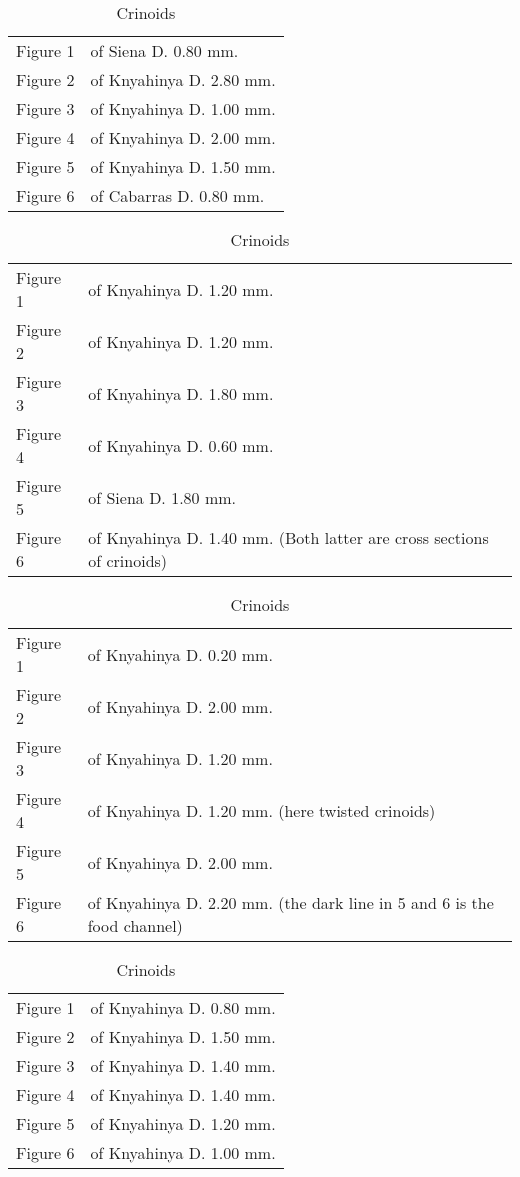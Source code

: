 \documentclass[a4paper, 12pt, oneside]{article}
\begin{document}
\begin{table}[ht!]
\caption{Crinoids}
\centering
\begin{tabular}{ p{2cm} p{10cm} }
\hline
 Figure 1 & of Siena D. 0.80 mm. \\
 Figure 2 & of Knyahinya D. 2.80 mm. \\
 Figure 3 & of Knyahinya D. 1.00 mm. \\
 Figure 4 & of Knyahinya D. 2.00 mm. \\
 Figure 5 & of Knyahinya D. 1.50 mm. \\
 Figure 6 & of Cabarras D. 0.80 mm.
\end{tabular}
\label{table:24}
\end{table}
\begin{table}[ht!]
\caption{Crinoids}
\centering
\begin{tabular}{ p{2cm} p{10cm} }
\hline
 Figure 1 & of Knyahinya D. 1.20 mm. \\
 Figure 2 & of Knyahinya D. 1.20 mm. \\
 Figure 3 & of Knyahinya D. 1.80 mm. \\
 Figure 4 & of Knyahinya D. 0.60 mm. \\
 Figure 5 & of Siena D. 1.80 mm. \\
 Figure 6 & of Knyahinya D. 1.40 mm. (Both latter are cross sections of crinoids)
\end{tabular}
\label{table:25}
\end{table}
\begin{table}[ht!]
\caption{Crinoids}
\centering
\begin{tabular}{ p{2cm} p{10cm} }
\hline
 Figure 1 & of Knyahinya D. 0.20 mm. \\
 Figure 2 & of Knyahinya D. 2.00 mm. \\
 Figure 3 & of Knyahinya D. 1.20 mm. \\
 Figure 4 & of Knyahinya D. 1.20 mm. (here twisted crinoids) \\
 Figure 5 & of Knyahinya D. 2.00 mm. \\
 Figure 6 & of Knyahinya D. 2.20 mm. (the dark line in 5 and 6 is the food channel)
\end{tabular}
\label{table:26}
\end{table}
\begin{table}[ht!]
\caption{Crinoids}
\centering
\begin{tabular}{ p{2cm} p{10cm} }
\hline
 Figure 1 & of Knyahinya D. 0.80 mm. \\
 Figure 2 & of Knyahinya D. 1.50 mm. \\
 Figure 3 & of Knyahinya D. 1.40 mm. \\
 Figure 4 & of Knyahinya D. 1.40 mm. \\
 Figure 5 & of Knyahinya D. 1.20 mm. \\
 Figure 6 & of Knyahinya D. 1.00 mm.
\end{tabular}
\label{table:27}
\end{table}
\end{document}
